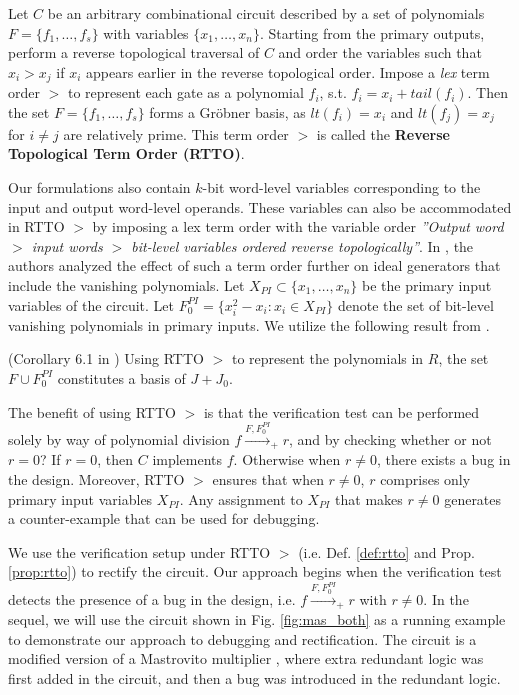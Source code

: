 \begin{Definition}
\label{def:rtto}
Let $C$ be an arbitrary combinational
circuit described by a set of polynomials $F=\{f_1,\dots,f_s\}$ with
variables $\{x_1,\dots,x_n\}$. Starting from the primary outputs,
perform a reverse topological traversal of $C$ and order the variables
such that $x_i>x_j$ if $x_i$ appears earlier in the reverse
topological order. Impose a {\it lex} term order $>$ to
represent each gate as a polynomial $f_i$, s.t. $f_i = x_i +
tail(f_i)$. Then the set $F=\{f_1, \dots, f_s\}$
forms a Gr\"obner basis, as $lt(f_i)=x_i$ and $lt(f_j)=x_j$ for
$i\neq j$ are relatively prime. This term order $>$ is called the {\bf
 Reverse Topological Term Order (RTTO)}.  
\end{Definition}


Our formulations also contain $k$-bit word-level variables
corresponding to the input and output word-level operands. These
variables can also be accommodated in RTTO $>$ by imposing a lex term
order with the variable order {\it ''Output word $>$ input words $>$
  bit-level variables ordered reverse topologically''}.  In
\cite{lv:tcad2013}, the authors analyzed the effect of such a term
order further on ideal generators that include the vanishing
polynomials. Let $X_{PI} \subset \{x_1,\dots,x_n\}$  be the primary
input variables of the circuit. Let $F_0^{PI}=\{x_i^2-x_i:x_i\in
X_{PI}\}$ denote the set of bit-level vanishing polynomials in primary
inputs. We utilize the following result from \cite{lv:tcad2013}. 


\begin{Proposition}\label{prop:rtto}
(Corollary 6.1 in \cite{lv:tcad2013}) Using RTTO $>$ to represent the
  polynomials in $R$, the set $F\cup F_{0}^{PI}$ constitutes a
  \Grobner basis of $J+J_0$.  
\end{Proposition}

The benefit of using RTTO $>$ is that the verification test can be
performed solely by way of polynomial division
$f\xrightarrow{F,F_{0}^{PI}}_+r$, and by checking whether or not $r=0$?
If $r=0$, then $C$ implements $f$. Otherwise when $r\neq 0$, there
exists a bug in the design. Moreover, RTTO $>$ ensures that when
$r\neq 0$, $r$ comprises only primary input variables $X_{PI}$. Any
assignment to $X_{PI}$ that makes $r\neq 0$ generates a
counter-example that can be used for debugging. 

We use the verification setup under RTTO $>$ (i.e. Def. \ref{def:rtto}
and Prop. \ref{prop:rtto}) to rectify the circuit. Our approach begins
when the verification test detects the presence of a bug in the
design, i.e. $f\xrightarrow{F,F_{0}^{PI}}_+r$ with $r\neq 0$. 
In the sequel, we will use the circuit shown in
Fig. \ref{fig:mas_both} as a running example to demonstrate our
approach to debugging and rectification. The circuit is a modified
version of a Mastrovito multiplier \cite{mastro:1989}, where extra
redundant logic was first added in the circuit, and then a bug was
introduced in the redundant logic. 

